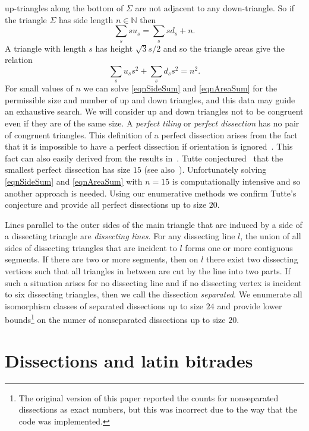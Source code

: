 \documentclass[12pt,amstags,fleqn]{article}
\theoremstyle{plain}
\theoremstyle{definition}
\begin{document}
up-triangles along the bottom of $\Sigma$ are not adjacent to any
down-triangle. So if the triangle $\Sigma$ has side length $n \in
\mathbb{N}$ then
\begin{equation}\label{eqnSideSum}
\sum_{s} s u_{s} = \sum_{s} s d_{s} + n.
\end{equation}
A triangle with length ${s}$ has height $\sqrt{3}{s}/2$ and so 
the triangle areas give the relation
\begin{equation}\label{eqnAreaSum}
\sum_s u_s s^2 + \sum_s d_s s^2 = n^2.
\end{equation}
For small values of $n$ we can solve \eqref{eqnSideSum} and \eqref{eqnAreaSum}
for the permissible
size and number of up and down triangles, and this data may guide an
exhaustive search.
We will consider up and down triangles not to be congruent even
if they are of the same size. A {\em perfect tiling} or
{\em perfect dissection} has no pair of congruent triangles.
This definition of a perfect dissection arises from the fact that 
it is impossible to have a perfect dissection if orientation is
ignored~\cite{MR0003040}. This fact can also easily derived from the
results in~\cite{aleshamming}.
Tutte conjectured~\cite{MR0003040,MR0027521} that the smallest perfect
dissection has size $15$ (see also~\cite{squaring}).  Unfortunately
solving \eqref{eqnSideSum} and \eqref{eqnAreaSum} with $n = 15$ is computationally intensive and so
another approach is needed.  Using our enumerative methods we confirm Tutte's
conjecture and provide all perfect dissections up to size $20$. 


Lines parallel to the outer sides of the main triangle
that are induced by a side
of a dissecting triangle are \emph{dissecting lines}.
For any dissecting line $l$,
the union of all sides of dissecting triangles
that are incident to $l$ forms
one or more contiguous segments. If there are two or more segments,
then on $l$ there exist
two dissecting vertices such that all
triangles in between are cut by the line into two parts. If such
a situation arises for no dissecting line and if no
dissecting vertex is incident to six dissecting triangles,
then we call the dissection {\em separated}.
We enumerate all isomorphism classes of 
separated dissections up to size $24$ and provide lower 
bounds\footnote{The original version of this paper reported the counts for nonseparated dissections
as exact numbers, but this was incorrect due to the way that the code was implemented.}
on the numer of nonseparated dissections up to size $20$.

\section{Dissections and latin bitrades}
\end{document}
